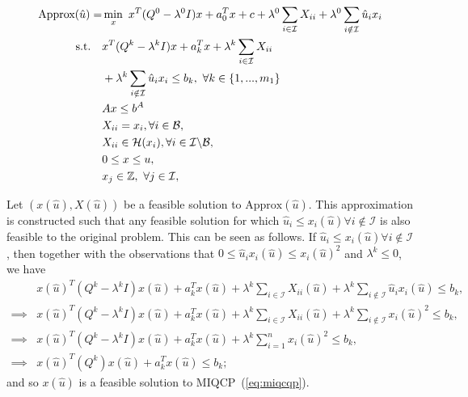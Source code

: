 \documentclass[]{article}
\begin{document}
\begin{subequations}\label{eq:approx_miqcqp}
    \begin{align}
        \mbox{Approx}(\hat{u}) = &\min_x \ x^T(Q^0 - \lambda^0 I)x + a_0^Tx + c + \lambda^0\sum_{i\in\mathcal{I}} X_{ii} + \lambda^0\sum_{i\notin\mathcal{I}} \hat{u}_ix_i \label{eq:approx_miqcqp_obj} \\
        \mbox{s.t.}\quad &x^T(Q^k - \lambda^k I)x + a_k^Tx + \lambda^k\sum_{i\in\mathcal{I}} X_{ii}\notag \\
        &+ \lambda^k\sum_{i\notin\mathcal{I}} \hat{u}_ix_i \leq b_k,\ \forall k\in\{1,...,m_1\} \label{eq:approx_miqcqp_qcon}\\
        &Ax \leq b^A\\
        &X_{ii} = x_i, \forall i\in\mathcal{B},\\
        &X_{ii} \in \mathcal{H}(x_i), \forall i\in\mathcal{I}\backslash \mathcal{B},\\
        &0 \leq x \leq u,\\
        &x_j\in \mathbb{Z},\ \forall j\in\mathcal{I},
    \end{align}
\end{subequations}


Let $(x(\hat{u}), X(\hat{u}))$ be a feasible solution to $\mbox{Approx}(\hat{u})$.  This approximation is constructed such that any feasible solution for which $\hat{u}_i \leq x_i(\hat{u}) \forall i\notin\mathcal{I}$ is also feasible to the original problem. This can be seen as follows. If $\hat{u}_i \leq x_i(\hat{u}) \forall i\not\in \mathcal{I}$, then together with the observations that $0\leq \hat{u}_ix_i(\hat{u}) \leq x_i(\hat{u})^2$ and $\lambda^k \leq 0$, we have
\begin{equation*}
    \begin{aligned}
        &x(\hat{u})^T(Q^k - \lambda^k I)x(\hat{u}) + a_k^Tx(\hat{u}) +\lambda^k\sum_{i\in\mathcal{I}} X_{ii}(\hat{u})+ \lambda^k\sum_{i\notin\mathcal{I}} \hat{u}_ix_i(\hat{u})\leq b_k,\\
        \implies &x(\hat{u})^T(Q^k - \lambda^k I)x(\hat{u}) + a_k^Tx(\hat{u}) + \lambda^k\sum_{i\in\mathcal{I}} X_{ii}(\hat{u})+ \lambda^k\sum_{i\notin\mathcal{I}} x_i(\hat{u})^2\leq b_k,\\
        \implies &x(\hat{u})^T(Q^k - \lambda^k I)x(\hat{u}) + a_k^Tx(\hat{u}) + \lambda^k\sum_{i=1}^n x_i(\hat{u})^2 \leq b_k,\\
        \implies &x(\hat{u})^T(Q^k)x(\hat{u}) + a_k^Tx(\hat{u})\leq b_k;
    \end{aligned}
\end{equation*}
and so $x(\hat{u})$ is a feasible solution to MIQCP~(\ref{eq:miqcqp}). 
\end{document}

